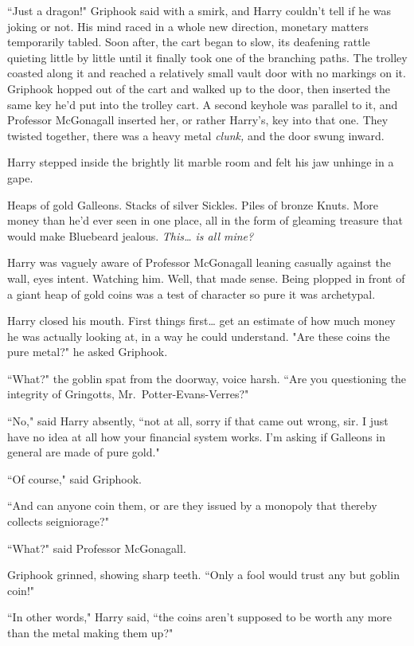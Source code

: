 ``Just a dragon!" Griphook said with a smirk, and Harry
couldn't tell if he was joking or not. His mind raced in a
whole new direction, monetary matters temporarily tabled.
Soon after, the cart began to slow, its deafening rattle
quieting little by little until it finally took one of the
branching paths. The trolley coasted along it and reached a
relatively small vault door with no markings on it. Griphook
hopped out of the cart and walked up to the door, then
inserted the same key he'd put into the trolley cart. A
second keyhole was parallel to it, and Professor McGonagall
inserted her, or rather Harry's, key into that one. They
twisted together, there was a heavy metal \emph{clunk,} and the
door swung inward.

Harry stepped inside the brightly lit marble room and felt
his jaw unhinge in a gape.

Heaps of gold Galleons. Stacks of silver Sickles. Piles of
bronze Knuts. More money than he'd ever seen in one
place, all in the form of gleaming treasure that would make
Bluebeard jealous. \emph{This{\ldots} is all mine?}

Harry was vaguely aware of Professor McGonagall leaning casually against the wall, eyes intent. Watching him. Well, that made sense. Being plopped in front of a giant heap of gold coins was a test of character so pure it was archetypal.

Harry closed his mouth. First things first{\ldots} get an estimate of how much money he was actually looking at, in a way he could understand. "Are these coins the pure metal?" he asked Griphook.

``What?" the goblin spat from the doorway, voice harsh. ``Are you questioning the integrity of Gringotts, Mr.~Potter-Evans-Verres?"

``No," said Harry absently, ``not at all, sorry if that came out wrong, sir. I just have no idea at all how your financial system works. I'm asking if Galleons in general are made of pure gold."

``Of course," said Griphook.

``And can anyone coin them, or are they issued by a monopoly that thereby collects seigniorage?"

``What?" said Professor McGonagall.

Griphook grinned, showing sharp teeth. ``Only a fool would trust any but goblin coin!"

``In other words," Harry said, ``the coins aren't supposed to be worth any more than the metal making them up?"

